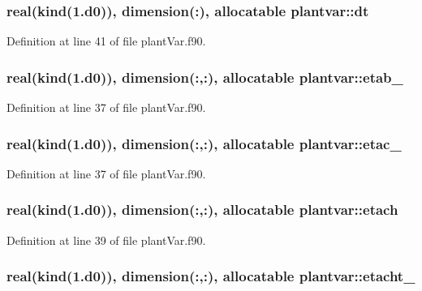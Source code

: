 \hypertarget{classplantvar_accb7934f0d0c68401dc43ec6bb59bbe4}{
\subsubsection[{dt}]{\setlength{\rightskip}{0pt plus 5cm}real(kind(1.d0)), dimension(\-:), allocatable plantvar\-::dt}}\label{classplantvar_accb7934f0d0c68401dc43ec6bb59bbe4}


Definition at line 41 of file plant\-Var.\-f90.

\hypertarget{classplantvar_a1a598548c66afe280ab1e9b3bc0d108c}{
\subsubsection[{etab\-\_\-}]{\setlength{\rightskip}{0pt plus 5cm}real(kind(1.d0)), dimension(\-:,\-:), allocatable plantvar\-::etab\-\_\-}}\label{classplantvar_a1a598548c66afe280ab1e9b3bc0d108c}


Definition at line 37 of file plant\-Var.\-f90.

\hypertarget{classplantvar_a43d9f2b69d22ee7dea582ef47917a222}{
\subsubsection[{etac\-\_\-}]{\setlength{\rightskip}{0pt plus 5cm}real(kind(1.d0)), dimension(\-:,\-:), allocatable plantvar\-::etac\-\_\-}}\label{classplantvar_a43d9f2b69d22ee7dea582ef47917a222}


Definition at line 37 of file plant\-Var.\-f90.

\hypertarget{classplantvar_a6a8479fe7ccd064d132fe1a76632c7a4}{
\subsubsection[{etach}]{\setlength{\rightskip}{0pt plus 5cm}real(kind(1.d0)), dimension(\-:,\-:), allocatable plantvar\-::etach}}\label{classplantvar_a6a8479fe7ccd064d132fe1a76632c7a4}


Definition at line 39 of file plant\-Var.\-f90.

\hypertarget{classplantvar_a0bcd182c0cec3e561b2fe88b6c65550a}{
\subsubsection[{etacht\-\_\-}]{\setlength{\rightskip}{0pt plus 5cm}real(kind(1.d0)), dimension(\-:,\-:), allocatable plantvar\-::etacht\-\_\-}}\label{classplantvar_a0bcd182c0cec3e561b2fe88b6c65550a}


